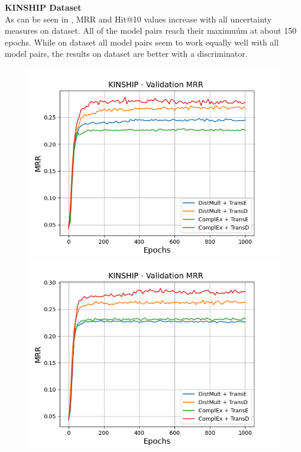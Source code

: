 \textbf{KINSHIP Dataset}
\label{subsubsec:metrics_kinship}\\
%
As can be seen in , MRR and Hit@10 values increase with all uncertainty measures on \kinship dataset.
All of the model pairs reach their maximuúm at about 150 epochs.
While on \umls dataset all model pairs seem to work equally well with all model pairs, the results on \kinship dataset are better with a \transd discriminator.
\begin{figure}[H]
    \centering
    \begin{minipage}{.5\textwidth}
      \centering
      \includegraphics[width=0.9\linewidth]{figures/results/gan_train/not_pretrained/uncertainty/max_distribution/entropy/kinship/1k_epochs/uncertainty_kinship_mrrs.png}
    \end{minipage}%
    \begin{minipage}{.5\textwidth}
      \centering
      \includegraphics[width=0.9\linewidth]{figures/results/gan_train/not_pretrained/uncertainty/max_distribution/least_confidence/kinship/uncertainty_kinship_mrrs.png}

\end{minipage}
\end{figure}
